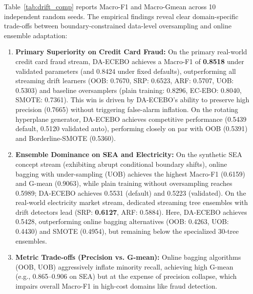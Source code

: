 \documentclass[preprint,10pt]{elsarticle}
\begin{document}
Table~\ref{tab:drift_comp} reports Macro-F1 and Macro-Gmean across 10 independent random seeds. The empirical findings reveal clear domain-specific trade-offs between boundary-constrained data-level oversampling and online ensemble adaptation:
\begin{enumerate}[leftmargin=1.5em]
\item \textbf{Primary Superiority on Credit Card Fraud:} On the primary real-world credit card fraud stream, DA-ECEBO achieves a Macro-F1 of \textbf{0.8518} under validated parameters (and 0.8424 under fixed defaults), outperforming all streaming drift learners (OOB: 0.7670, SRP: 0.6523, ARF: 0.5707, UOB: 0.5303) and baseline oversamplers (plain training: 0.8296, EC-EBO: 0.8040, SMOTE: 0.7361). This win is driven by DA-ECEBO's ability to preserve high precision (0.7665) without triggering false-alarm inflation. On the rotating hyperplane generator, DA-ECEBO achieves competitive performance (0.5439 default, 0.5120 validated auto), performing closely on par with OOB (0.5391) and Borderline-SMOTE (0.5360).
\item \textbf{Ensemble Dominance on SEA and Electricity:} On the synthetic SEA concept stream (exhibiting abrupt conditional boundary shifts), online bagging with under-sampling (UOB) achieves the highest Macro-F1 (0.6159) and G-mean (0.9063), while plain training without oversampling reaches 0.5989; DA-ECEBO achieves 0.5531 (default) and 0.5223 (validated). On the real-world electricity market stream, dedicated streaming tree ensembles with drift detectors lead (SRP: \textbf{0.6127}, ARF: 0.5884). Here, DA-ECEBO achieves 0.5428, outperforming online bagging alternatives (OOB: 0.4263, UOB: 0.4430) and SMOTE (0.4954), but remaining below the specialized 30-tree ensembles.
\item \textbf{Metric Trade-offs (Precision vs. G-mean):} Online bagging algorithms (OOB, UOB) aggressively inflate minority recall, achieving high G-mean (e.g., 0.865--0.906 on SEA) but at the expense of precision collapse, which impairs overall Macro-F1 in high-cost domains like fraud detection.
\end{enumerate}
\end{document}
